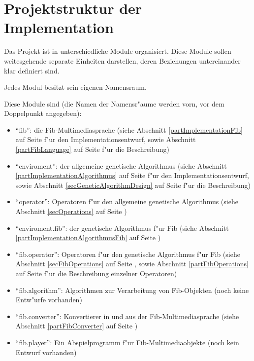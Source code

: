 %
%
%
%

\graphicspath{{./sonstiges/}}
\graphicspath{{./sonstiges/}{../sonstiges}}

\newpage
\part{Projektstruktur der Implementation}
\label{partFibProjectstructurImplementation}


Das Projekt ist in unterschiedliche Module organisiert. Diese Module sollen weitesgehende separate Einheiten darstellen, deren Beziehungen untereinander klar definiert sind.

Jedes Modul besitzt sein eigenen Namensraum.

\noindent
Diese Module sind (die Namen der Namensr"aume werden vorn, vor dem Doppelpunkt angegeben):
\begin{itemize}
 \item ``fib'': die Fib-Multimediasprache (siehe Abschnitt \ref{partImplementationFib} auf Seite \pageref{partImplementationFib} f"ur den Implementationsentwurf, sowie Abschnitt \ref{partFibLanguage} auf Seite \pageref{partFibLanguage} f"ur die Beschreibung)
 \item ``enviroment'': der allgemeine genetische Algorithmus (siehe Abschnitt \ref{partImplementationAlgorithmus} auf Seite \pageref{partImplementationAlgorithmus} f"ur den Implementationsentwurf, sowie Abschnitt \ref{secGeneticAlgorithmDesign} auf Seite \pageref{secGeneticAlgorithmDesign} f"ur die Beschreibung)
 \item ``operator'': Operatoren f"ur den allgemeine genetische Algorithmus (siehe Abschnitt \ref{secOperations} auf Seite \pageref{secOperations})
 \item ``enviroment.fib'': der genetische Algorithmus f"ur Fib (siehe Abschnitt \ref{partImplementationAlgorithmusFib} auf Seite \pageref{partImplementationAlgorithmusFib})
 \item ``fib.operator'': Operatoren f"ur den genetische Algorithmus f"ur Fib (siehe Abschnitt \ref{secFibOperations} auf Seite \pageref{secFibOperations}, sowie Abschnitt \ref{partFibOperations} auf Seite \pageref{partFibOperations} f"ur die Beschreibung einzelner Operatoren)
 \item ``fib.algorithm'': Algorithmen zur Verarbeitung von Fib-Objekten (noch keine Entw"urfe vorhanden) %
 \item ``fib.converter'': Konvertierer in und aus der Fib-Multimediasprache (siehe Abschnitt \ref{partFibConverter} auf Seite \pageref{partFibConverter})
 \item ``fib.player'': Ein Abspielprogramm f"ur Fib-Multimediaobjekte (noch kein Entwurf vorhanden) %
\end{itemize}


